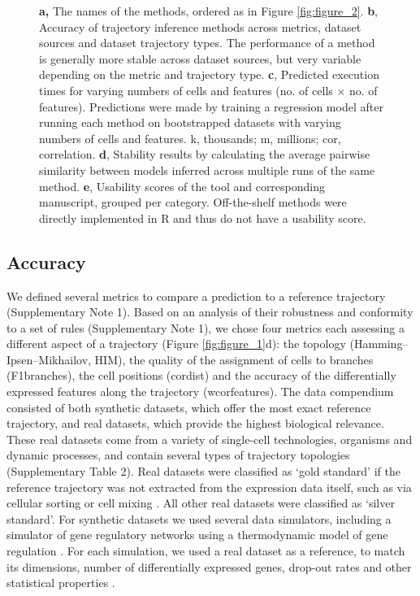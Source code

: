\begin{figure}[htb!]
{		\textbf{a,} The names of the methods, ordered as in Figure \ref{fig:figure_2}. \textbf{b}, Accuracy of trajectory inference methods across metrics, dataset sources and dataset trajectory types. The performance of a method is generally more stable across dataset sources, but very variable depending on the metric and trajectory type. \textbf{c}, Predicted execution times for varying numbers of cells and features (no. of cells $\times$ no. of features). Predictions were made by training a regression model after running each method on bootstrapped datasets with varying numbers of cells and features. k, thousands; m, millions; cor, correlation. \textbf{d}, Stability results by calculating the average pairwise similarity between models inferred across multiple runs of the same method. \textbf{e}, Usability scores of the tool and corresponding manuscript, grouped per category. Off-the-shelf methods were directly implemented in R and thus do not have a usability score. 
	}
	\label{fig:figure_3}
\end{figure}

\subsection{Accuracy}

We defined several metrics to compare a prediction to a reference trajectory (Supplementary Note 1). Based on an analysis of their robustness and conformity to a set of rules (Supplementary Note 1), we chose four metrics each assessing a different aspect of a trajectory (Figure \ref{fig:figure_1}d): the topology (Hamming–Ipsen–Mikhailov, HIM), the quality of the assignment of cells to branches (F1branches), the cell positions (cordist) and the accuracy of the differentially expressed features along the trajectory (wcorfeatures). The data compendium consisted of both synthetic datasets, which offer the most exact reference trajectory, and real datasets, which provide the highest biological relevance. These real datasets come from a variety of single-cell technologies, organisms and dynamic processes, and contain several types of trajectory topologies (Supplementary Table 2). Real datasets were classified as ‘gold standard’ if the reference trajectory was not extracted from the expression data itself, such as via cellular sorting or cell mixing \cite{tian_scrnaseqmixologybetter_2018}. All other real datasets were classified as ‘silver standard’. For synthetic datasets we used several data simulators, including a simulator of gene regulatory networks using a thermodynamic model of gene regulation \cite{schaffter_genenetweaversilicobenchmark_2011}. For each simulation, we used a real dataset as a reference, to match its dimensions, number of differentially expressed genes, drop-out rates and other statistical properties \cite{zappia_splattersimulationsinglecell_2017}.

